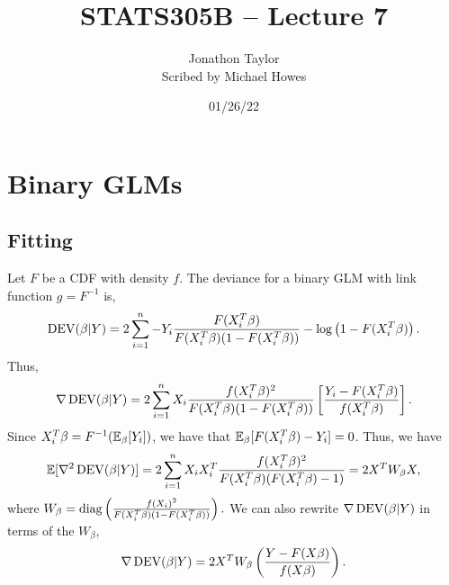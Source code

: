 




\title{STATS305B -- Lecture 7}
\author{Jonathon Taylor\\ Scribed by Michael Howes}
\date{01/26/22}

\pagestyle{fancy}
\fancyhf{}


\maketitle
\tableofcontents
\section{Binary GLMs}
\subsection{Fitting}
Let $F$ be a CDF with density $f$. The deviance for a binary GLM with link function $g=F^{-1}$ is,
\[\operatorname{DEV}(\beta|Y) = 2\sum_{i=1}^n - Y_i \frac{F(X_i^T\beta)}{F(X_i^T\beta)(1-F(X_i^T\beta))} - \log\left(1-F(X_i^T\beta)\right). \]
Thus, 
\[\nabla \operatorname{DEV}(\beta|Y) = 2\sum_{i=1}^n X_i \frac{f(X_i^T\beta)^2}{F(X_i^T\beta)(1-F(X_i^T\beta))}\left[\frac{Y_i-F(X_i^T\beta)}{f(X_i^T\beta)}\right]. \]
Since $X_i^T\beta = F^{-1}({\mathbb{E}}_\beta[Y_i])$, we have that ${\mathbb{E}}_\beta [F(X_i^T\beta)-Y_i] = 0$. Thus, we have
\[{\mathbb{E}}[\nabla^2 \operatorname{DEV}(\beta|Y)] = 2\sum_{i=1}^n X_iX_i^T\frac{f(X_i^T\beta)^2}{F(X_i^T\beta)(F(X_i^T\beta)-1)} = 2X^TW_\beta X, \]
where $W_\beta = \operatorname{diag}\left(\frac{f(X_i)^2}{F(X_i^T\beta)(1-F(X_i^T\beta))}\right).$ We can also rewrite $\nabla \operatorname{DEV}(\beta|Y)$ in terms of the $W_\beta$,
\[\nabla \operatorname{DEV}(\beta|Y) = 2X^TW_\beta \left(\frac{Y-F(X\beta)}{f(X\beta)}\right). \]
